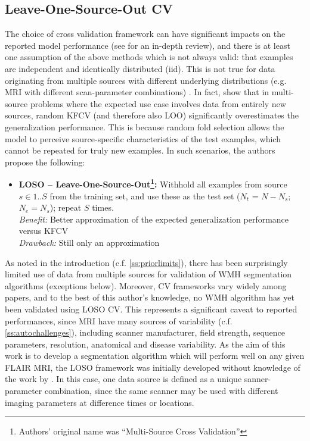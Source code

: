 \subsection{Leave-One-Source-Out CV}
The choice of cross validation framework can have significant impacts on the reported model performance (see \cite{Arlot2010} for an in-depth review), and there is at least one assumption of the above methods which is not always valid: that examples are independent and identically distributed (iid). This is not true for data originating from multiple sources with different underlying distributions (e.g. MRI with different scan-parameter combinations) \cite{Geras2013}. In fact, \citeauthor{Geras2013} show that in multi-source problems where the expected use case involves data from entirely new sources, random KFCV (and therefore also LOO) significantly overestimates the generalization performance. This is because random fold selection allows the model to perceive source-specific characteristics of the test examples, which cannot be repeated for truly new examples. In such scenarios, the authors propose the following:
\begin{itemize}
  \item \textbf{LOSO -- Leave-One-Source-Out\footnote{Authors' original name was ``Multi-Source Cross Validation''}:} Withhold all examples from source $s\in 1..S$ from the training set, and use these as the test set ($N_t$ = $N-N_s$; $N_e = N_s$); repeat $S$ times.
  \\\textit{Benefit:} Better approximation of the expected generalization performance versus KFCV
  \\\textit{Drawback:} Still only an approximation
\end{itemize}
As noted in the introduction (c.f. \ref{ss:priorlimits}), there has been surprisingly limited use of data from multiple sources for validation of WMH segmentation algorithms (exceptions below). Moreover, CV frameworks vary widely among papers, and to the best of this author's knowledge, no WMH algorithm has yet been validated using LOSO CV. This represents a significant caveat to reported performances, since MRI have many sources of variability (c.f. \ref{ss:autochallenges}), including scanner manufacturer, field strength, sequence parameters, resolution, anatomical and disease variability. As the aim of this work is to develop a segmentation algorithm which will perform well on any given FLAIR MRI, the LOSO framework was initially developed without knowledge of the work by \citeauthor{Geras2013}. In this case, one data source is defined as a unique sanner-parameter combination, since the same scanner may be used with different imaging parameters at difference times or locations.
